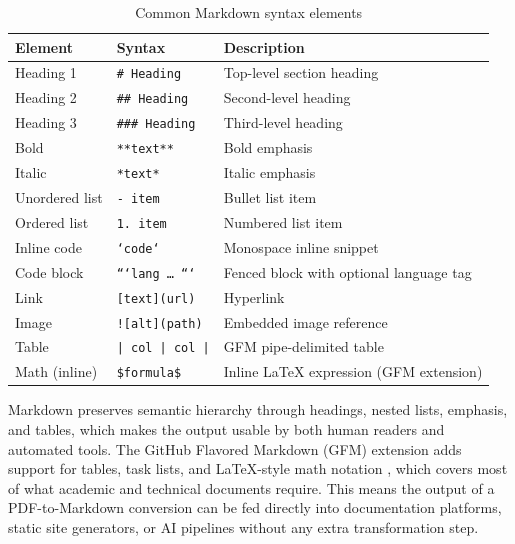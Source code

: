 \begin{table}[ht]
\centering
\caption{Common Markdown syntax elements}
\label{tab:markdown_syntax}
\renewcommand{\arraystretch}{1.4}
\begin{tabularx}{\textwidth}{llX}
\toprule
\textbf{Element} & \textbf{Syntax} & \textbf{Description} \\
\midrule
Heading 1       & \texttt{\# Heading}           & Top-level section heading \\
Heading 2       & \texttt{\#\# Heading}          & Second-level heading \\
Heading 3       & \texttt{\#\#\# Heading}        & Third-level heading \\
Bold            & \texttt{**text**}             & Bold emphasis \\
Italic          & \texttt{*text*}               & Italic emphasis \\
Unordered list  & \texttt{- item}               & Bullet list item \\
Ordered list    & \texttt{1. item}              & Numbered list item \\
Inline code     & \texttt{`code`}               & Monospace inline snippet \\
Code block      & \texttt{```lang \ldots{} ```} & Fenced block with optional language tag \\
Link            & \texttt{[text](url)}          & Hyperlink \\
Image           & \texttt{![alt](path)}         & Embedded image reference \\
Table           & \texttt{| col | col |}        & GFM pipe-delimited table \\
Math (inline)   & \texttt{\$formula\$}          & Inline \LaTeX{} expression (GFM extension) \\
\bottomrule
\end{tabularx}
\end{table}

Markdown preserves semantic hierarchy through headings, nested lists, emphasis,
and tables, which makes the output usable by both human readers and automated
tools. The GitHub Flavored Markdown (GFM) extension adds support for tables,
task lists, and \LaTeX-style math notation \autocite{duan2025}, which covers most
of what academic and technical documents require. This means the output of a
PDF-to-Markdown conversion can be fed directly into documentation platforms,
static site generators, or AI pipelines without any extra transformation step.


